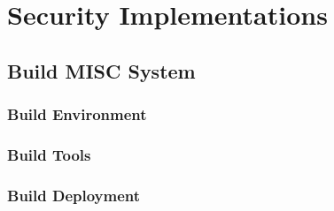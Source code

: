 \documentclass[11pt,oneside,onecolumn,letterpaper]{article}
\begin{document}
\section{Security Implementations}


\subsection{Build MISC System}

\subsubsection{Build Environment}


\subsubsection{Build Tools}

\subsubsection{Build Deployment}
\end{document}
